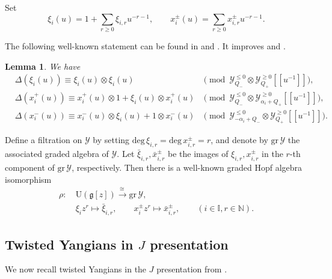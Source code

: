 \documentclass[11pt,reqno]{amsart}
\numberwithin{equation}{section}
\newtheorem{lem}[thm]{Lemma}
\theoremstyle{definition}
\theoremstyle{remark}
\newcommand{\beq}{\begin{equation}}
\newcommand{\eeq}{\end{equation}}
\newcommand{\be}{\begin{equation*}}
\newcommand{\ee}{\end{equation*}}
\newcommand{\bN}{\mathbb{N}}
\newcommand{\g}{\mathfrak{g}}
\newcommand{\gr}{{\mathrm{gr}}}
\newcommand{\gge}{\geqslant}
\newcommand{\lle}{\leqslant}
\newcommand{\I}{{\mathbb I}}
\newcommand{\Y}{{\mathscr{Y}}}
\begin{document}
Set
\be
\xi_i(u)=1+\sum_{r\gge 0}\xi_{i,r}u^{-r-1},\qquad  x_i^\pm(u)=\sum_{r\gge 0}x_{i,r}^\pm u^{-r-1}.
\ee

The following well-known statement can be found in \cite[Proposition 2.9]{GW23} and \cite[Lemma 2.5]{HZ24}. It improves \cite[Lemma 1]{Kn95} and \cite[Proposition 2.8]{CP91}.
\begin{lem}\label{lem:copro}
We have
\begin{align*}
&\Delta(\xi_i(u))\equiv \xi_i(u)\otimes \xi_i(u) &\pmod{\Y^{\lle 0}_{Q_-}\otimes \Y^{\gge0}_{Q_+}[\![u^{-1}]\!]},\\
&\Delta(x_i^+(u)) \equiv x_i^+(u)\otimes 1+\xi_i(u)\otimes x_i^+(u) &\pmod{\Y^{\lle 0}_{Q_-}\otimes \Y^{\gge0}_{\alpha_i+Q_+}[\![u^{-1}]\!]},\\
&\Delta(x_i^-(u)) \equiv x_i^-(u)\otimes \xi_i(u)+1\otimes x_i^-(u) &\pmod{\Y^{\lle 0}_{-\alpha_i+Q_-}\otimes \Y^{\gge0}_{Q_+}[\![u^{-1}]\!]}.
\end{align*}
\end{lem}

Define a filtration on $\Y$ by setting $\mathrm{deg}\,\xi_{i,r}=\mathrm{deg}\,x_{i,r}^\pm=r$, and denote by $\gr\,\Y$ the associated graded algebra of $\Y$. Let $\bar\xi_{i,r},\bar x_{i,r}^\pm$ be the images of $ \xi_{i,r}, x_{i,r}^\pm$ in the $r$-th component of $\mathrm{gr}\,\Y$, respectively. Then there is a well-known graded Hopf algebra isomorphism
\beq\label{ass}
\begin{split}
\rho:~&\mathrm{U}(\g[z])\stackrel{\cong\,}{\longrightarrow} \mathrm{gr}\,\Y, \\
&\xi_iz^r\mapsto \bar\xi_{i,r},\qquad x_i^{\pm }z^r \mapsto \bar x_{i,r}^\pm,\qquad  (i\in \I,r\in\bN).
\end{split}
\eeq


\subsection{Twisted Yangians in $J$ presentation}\label{sec:ty}
We now recall twisted Yangians in the $J$ presentation from \cite{Mac02,BR17}. 
\end{document}
